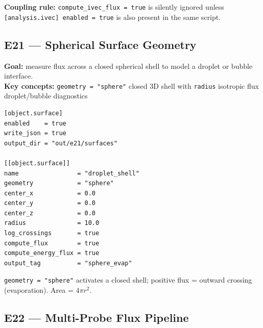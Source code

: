 \documentclass[11pt,a4paper]{article}
\begin{document}
\begin{tcolorbox}[enhanced, colback=vsimdoctrinebg, colframe=vsimdoctrinetop,
  arc=3pt, boxrule=0.8pt, left=6pt, right=6pt, top=4pt, bottom=4pt]
\footnotesize
\textbf{Coupling rule:} \texttt{compute\_ivec\_flux = true} is silently
ignored unless \texttt{[analysis.ivec] enabled = true} is also present
in the same script.
\end{tcolorbox}

\subsection*{E21 --- Spherical Surface Geometry}

\textbf{Goal:} measure flux across a closed spherical shell to model a droplet
or bubble interface.\\
\textbf{Key concepts:} \texttt{geometry = "sphere"} \textbullet{}
closed 3D shell with \texttt{radius} \textbullet{} isotropic flux \textbullet{}
droplet/bubble diagnostics

\begin{tcolorbox}[scriptbox, scriptheader,
  title={scripts/e21\_surface\_sphere\_geometry.vsim (excerpt)}]
\begin{lstlisting}[style=vsimlst]
[object.surface]
enabled    = true
write_json = true
output_dir = "out/e21/surfaces"

[[object.surface]]
name                = "droplet_shell"
geometry            = "sphere"
center_x            = 0.0
center_y            = 0.0
center_z            = 0.0
radius              = 10.0
log_crossings       = true
compute_flux        = true
compute_energy_flux = true
output_tag          = "sphere_evap"
\end{lstlisting}
\end{tcolorbox}

\begin{tcolorbox}[enhanced, colback=vsimcodebg, colframe=vsimrule,
  arc=3pt, boxrule=0.6pt, fonttitle=\sffamily\small\bfseries\color{vsimkw},
  title={Sphere note}]
\footnotesize
\texttt{geometry = "sphere"} activates a closed shell; positive flux = outward
crossing (evaporation). Area = $4\pi r^2$.
\end{tcolorbox}

\subsection*{E22 --- Multi-Probe Flux Pipeline}
\end{document}
